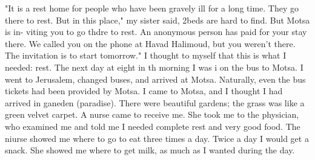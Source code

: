 "It is a rest home for people who have been gravely ill for a long time. They go there 
to rest. But in this place," my sister said, 2beds are hard to find. But Motsa is in-
viting you to go thdre to rest. An anonymous person has paid for your stay there. We 
called you on the phone at Havad Halimoud, but you weren't there. The invitation is to 
start tomorrow." 
I thought to myself that this is what I needed: rest. The next day at eight in th 
morning I was i on the bus to Motsa. I went to Jerusalem, changed buses, and arrived at 
Motsa. Naturally, even the bus tickets had been provided by Motsa. I came to Motsa, 
and I thought I had arrived in ganeden (paradise). There were beautiful gardens; the 
grass was like a green velvet carpet. A nurse came to receive me. She took me to the 
physician, who examined me and told me I needed complete rest and very good food. 
The niurse showed me where to go to eat three times a day. Twice a day I would 
get a snack. She showed me where to get milk, as much as I wanted during the day. 
